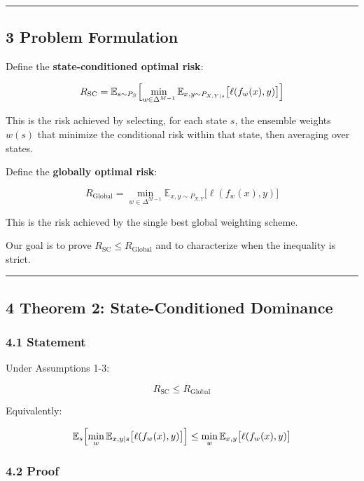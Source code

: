 \documentclass[
  12pt,
]{article}
\begin{document}
\begin{center}\rule{0.5\linewidth}{0.5pt}\end{center}

\subsection{3 Problem Formulation}\label{problem-formulation}

Define the \textbf{state-conditioned optimal risk}:

\[R_{\text{SC}} = \mathbb{E}_{s \sim P_S}\Bigl[\min_{w \in \Delta^{M-1}} \mathbb{E}_{x,y \sim P_{X,Y|s}}\bigl[\ell(f_w(x), y)\bigr]\Bigr]\]

This is the risk achieved by selecting, for each state \(s\), the
ensemble weights \(w(s)\) that minimize the conditional risk within that
state, then averaging over states.

Define the \textbf{globally optimal risk}:

\[R_{\text{Global}} = \min_{w \in \Delta^{M-1}} \mathbb{E}_{x,y \sim P_{X,Y}}\bigl[\ell(f_w(x), y)\bigr]\]

This is the risk achieved by the single best global weighting scheme.

Our goal is to prove \(R_{\text{SC}} \leq R_{\text{Global}}\) and to
characterize when the inequality is strict.

\begin{center}\rule{0.5\linewidth}{0.5pt}\end{center}

\subsection{4 Theorem 2: State-Conditioned
Dominance}\label{theorem-2-state-conditioned-dominance}

\subsubsection{4.1 Statement}\label{statement}

Under Assumptions 1-3:

\[R_{\text{SC}} \leq R_{\text{Global}}\]

Equivalently:

\[\mathbb{E}_{s}\Bigl[\min_{w} \mathbb{E}_{x,y|s}\bigl[\ell(f_w(x), y)\bigr]\Bigr] \leq \min_{w} \mathbb{E}_{x,y}\bigl[\ell(f_w(x), y)\bigr]\]

\subsubsection{4.2 Proof}\label{proof}
\end{document}
